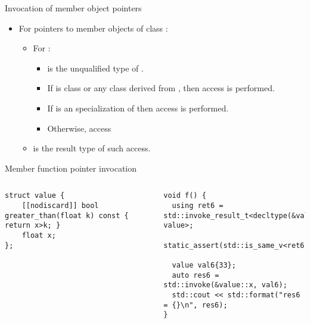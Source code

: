 \begin{frame}[t,fragile]{Invocation of member object pointers}
\begin{itemize}
  \item For pointers to member objects of class :
    \begin{itemize}
      \item For :
        \begin{itemize}
          \item {} is the unqualified type of .
          \item If  is class  or any class derived from ,
                then access  is performed.
          \item If  is an specialization of 
                then access  is performed.
          \item Otherwise,
                access 
        \end{itemize}
       \item {} 
             is the result type of such access.
    \end{itemize}
\end{itemize}
\begin{block}{Member function pointer invocation}
\begin{columns}[T]

\begin{lstlisting}[basicstyle=\tiny]
struct value {
    [[nodiscard]] bool greater_than(float k) const { return x>k; }
    float x;
};
\end{lstlisting}

\begin{lstlisting}[basicstyle=\tiny]
void f() {
  using ret6 = std::invoke_result_t<decltype(&value::x), value>;
  static_assert(std::is_same_v<ret6,float&&>);

  value val6{33};
  auto res6 = std::invoke(&value::x, val6);
  std::cout << std::format("res6 = {}\n", res6);
}
\end{lstlisting}
\end{columns}
\end{block}
\end{frame}
